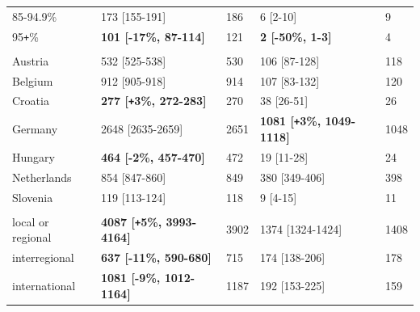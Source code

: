 \documentclass[11pt,twoside,]{book}
\def\Plus{\texttt{+}}
\begin{document}
\begin{table}[h]
{\begin{tabular}{L{3.4cm} R{4cm} L{.9cm} R{4.1cm} L{.9cm}}
\hspace{.7em}85-94.9\% & 173    [155-191] & 186 & 6      [2-10] & 9\\
\hspace{.7em}95\Plus\% & \textbf{101    [-17\%, 87-114]} & 121 & \textbf{2      [-50\%, 1-3]} & 4\\
\addlinespace[0.3em]
\\
\hspace{.7em}Austria & 532    [525-538] & 530 & 106    [87-128] & 118\\
\hspace{.7em}Belgium & 912    [905-918] & 914 & 107    [83-132] & 120\\
\hspace{.7em}Croatia & \textbf{277    [\Plus3\%, 272-283]} & 270 & 38     [26-51] & 26\\
\hspace{.7em}Germany & 2648   [2635-2659] & 2651 & \textbf{1081   [\Plus3\%, 1049-1118]} & 1048\\
\hspace{.7em}Hungary & \textbf{464    [-2\%, 457-470]} & 472 & 19     [11-28] & 24\\
\hspace{.7em}Netherlands & 854    [847-860] & 849 & 380    [349-406] & 398\\
\hspace{.7em}Slovenia & 119    [113-124] & 118 & 9      [4-15] & 11\\
\addlinespace[0.3em]
\\
\hspace{.7em}local or regional & \textbf{4087   [\Plus5\%, 3993-4164]} & 3902 & 1374   [1324-1424] & 1408\\
\hspace{.7em}interregional & \textbf{637    [-11\%, 590-680]} & 715 & 174    [138-206] & 178\\
\hspace{.7em}international & \textbf{1081   [-9\%, 1012-1164]} & 1187 & 192    [153-225] & 159\\
\bottomrule
\end{tabular}
}
\end{table}
\end{document}
